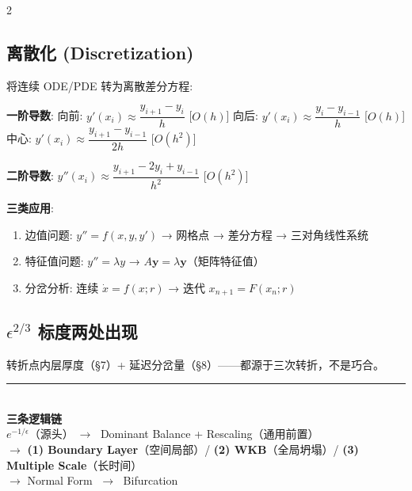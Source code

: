 \documentclass[10pt,a4paper]{article}
\newcommand{\eps}{\epsilon}
\begin{document}
\begin{multicols}{2}
\subsection*{离散化 (Discretization)}
将连续 ODE/PDE 转为离散差分方程:

\textbf{一阶导数}:
向前: $y'(x_i) \approx \dfrac{y_{i+1} - y_i}{h}$ \hfill [$O(h)$]\;
向后: $y'(x_i) \approx \dfrac{y_i - y_{i-1}}{h}$ \hfill [$O(h)$]\;
中心: $y'(x_i) \approx \dfrac{y_{i+1} - y_{i-1}}{2h}$ \hfill [$O(h^2)$]

\textbf{二阶导数}:
$y''(x_i) \approx \dfrac{y_{i+1} - 2y_i + y_{i-1}}{h^2}$ \hfill [$O(h^2)$]

\textbf{三类应用}:
\begin{enumerate}
\item 边值问题: $y'' = f(x,y,y')$ → 网格点 → 差分方程 → 三对角线性系统
\item 特征值问题: $y'' = \lambda y$ → $A\mathbf{y} = \lambda\mathbf{y}$（矩阵特征值）
\item 分岔分析: 连续 $\dot{x}=f(x;r)$ → 迭代 $x_{n+1}=F(x_n;r)$
\end{enumerate}

\subsection*{$\eps^{2/3}$ 标度两处出现}
转折点内层厚度（§7）+ 延迟分岔量（§8）——都源于三次转折，不是巧合。


\vfill
\begin{center}
\rule{0.4\columnwidth}{0.3pt}\\[3pt]
{\small\textbf{三条逻辑链}}\\[1pt]
{\normalsize $e^{-1/\eps}$（源头）$\;\to\;$ Dominant Balance + Rescaling（通用前置）}\\[1pt]
{\normalsize $\to$ \textbf{(1) Boundary Layer}（空间局部）\;/\;
        \textbf{(2) WKB}（全局坍塌）\;/\;
        \textbf{(3) Multiple Scale}（长时间）}\\[1pt]
{\normalsize $\to$ Normal Form $\;\to\;$ Bifurcation}
\end{center}

\end{multicols}
\end{document}
